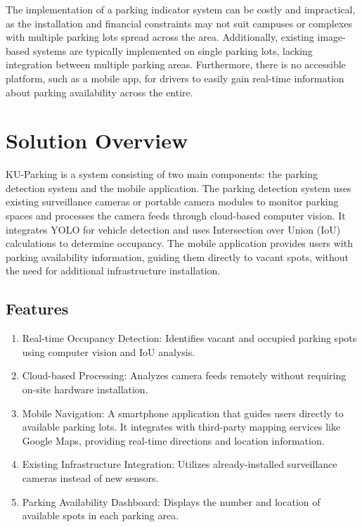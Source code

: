 The implementation of a parking indicator system can be costly and impractical, as the installation and financial constraints may not suit campuses or complexes with multiple parking lots spread across the area. Additionally, existing image-based systems are typically implemented on single parking lots, lacking integration between multiple parking areas. Furthermore, there is no accessible platform, such as a mobile app, for drivers to easily gain real-time information about parking availability across the entire.

\section{Solution Overview}
\label{section:solution-overview}

KU-Parking is a system consisting of two main components: the parking detection system and the mobile application. The parking detection system uses existing surveillance cameras or portable camera modules to monitor parking spaces and processes the camera feeds through cloud-based computer vision. It integrates YOLO for vehicle detection and uses Intersection over Union (IoU) calculations to determine occupancy. The mobile application provides users with parking availability information, guiding them directly to vacant spots, without the need for additional infrastructure installation.

\subsection{Features}
\label{subsection:features}

\begin{enumerate}[leftmargin=80pt]
    \item Real-time Occupancy Detection: Identifies vacant and occupied parking spots using computer vision and IoU analysis.
    \item Cloud-based Processing: Analyzes camera feeds remotely without requiring on-site hardware installation.
    \item Mobile Navigation: A smartphone application that guides users directly to available parking lots. It integrates with third-party mapping services like Google Maps, providing real-time directions and location information.
    \item Existing Infrastructure Integration: Utilizes already-installed surveillance cameras instead of new sensors.
    \item Parking Availability Dashboard: Displays the number and location of available spots in each parking area.
    \end{enumerate}

